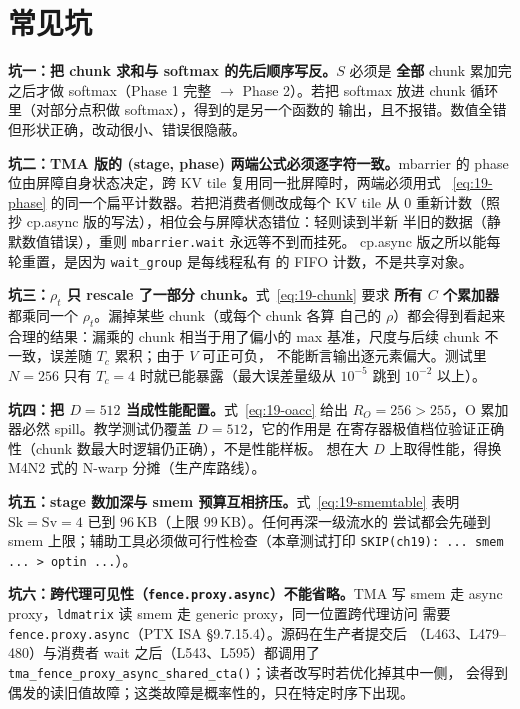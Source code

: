 \section{常见坑}

\textbf{坑一：把 chunk 求和与 softmax 的先后顺序写反。}$S$ 必须是
\textbf{全部} chunk 累加完之后才做 softmax（Phase 1 完整 $\to$ Phase 2）。若把
softmax 放进 chunk 循环里（对部分点积做 softmax），得到的是另一个函数的
输出，且不报错。数值全错但形状正确，改动很小、错误很隐蔽。

\textbf{坑二：TMA 版的 (stage, phase) 两端公式必须逐字符一致。}\allowbreak{}mbarrier 的
phase 位由屏障自身状态决定，跨 KV tile 复用同一批屏障时，两端必须用式
~\ref{eq:19-phase} 的同一个扁平计数器。若把消费者侧改成每个 KV tile 从 0
重新计数（照抄 cp.async 版的写法），相位会与屏障状态错位：轻则读到半新
半旧的数据（静默数值错误），重则 \texttt{mbarrier.\allowbreak{}wait} 永远等不到而挂死。
cp.async 版之所以能每轮重置，是因为 \texttt{wait\_group} 是每线程私有
的 FIFO 计数，不是共享对象。

\textbf{坑三：$\rho_t$ 只 rescale 了一部分 chunk。}式~\ref{eq:19-chunk} 要求
\textbf{所有 $C$ 个累加器}都乘同一个 $\rho_t$。漏掉某些 chunk（或每个 chunk 各算
自己的 $\rho$）都会得到看起来合理的结果：漏乘的 chunk 相当于用了偏小的
max 基准，尺度与后续 chunk 不一致，误差随 $T_c$ 累积；由于 $V$ 可正可负，
不能断言输出逐元素偏大。测试里 $N{=}256$ 只有
$T_c{=}4$ 时就已能暴露（最大误差量级从 $10^{-5}$ 跳到 $10^{-2}$ 以上）。

\textbf{坑四：把 $D{=}512$ 当成性能配置。}式~\ref{eq:19-oacc} 给出
$R_O = 256 > 255$，O 累加器必然 spill。教学测试仍覆盖 $D{=}512$，它的作用是
在寄存器极值档位验证正确性（chunk 数最大时逻辑仍正确），不是性能样板。
想在大 $D$ 上取得性能，得换 M4N2 式的 N-warp 分摊（生产库路线）。

\textbf{坑五：stage 数加深与 smem 预算互相挤压。}式~\ref{eq:19-smemtable} 表明
$\mathrm{Sk}=\mathrm{Sv}=4$ 已到 96\,KB（上限 99\,KB）。任何再深一级流水的
尝试都会先碰到 smem 上限；辅助工具必须做可行性检查（本章测试打印
\texttt{SKIP(ch19): ... smem ... > optin ...}）。

\textbf{坑六：跨代理可见性（\texttt{fence.\allowbreak{}proxy.\allowbreak{}async}）不能省略。}\allowbreak{}TMA 写 smem
走 async proxy，\texttt{ldmatrix} 读 smem 走 generic proxy，同一位置跨代理访问
需要 \texttt{fence.\allowbreak{}proxy.\allowbreak{}async}（PTX ISA §9.7.15.4）。源码在生产者提交后
（L463、L479--480）与消费者 wait 之后（L543、L595）都调用了
\texttt{tma\_\allowbreak{}fence\_\allowbreak{}proxy\_\allowbreak{}async\_\allowbreak{}shared\_\allowbreak{}cta\allowbreak{}()}；读者改写时若优化掉其中一侧，
会得到偶发的读旧值故障；这类故障是概率性的，只在特定时序下出现。

